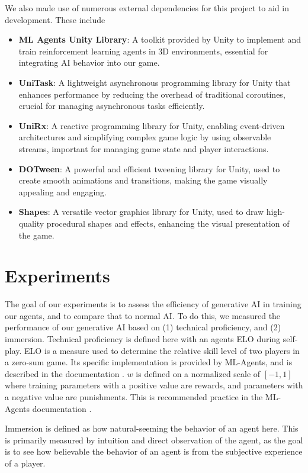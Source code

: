 \documentclass[a4paper,12pt,twocolumn]{article}
\begin{document}
We also made use of numerous external dependencies for this project to aid in development. These include
\begin{itemize}
    \item \textbf{ML Agents Unity Library}: A toolkit provided by Unity to implement and train reinforcement learning agents in 3D environments, essential for integrating AI behavior into our game.
    \item \textbf{UniTask}: A lightweight asynchronous programming library for Unity that enhances performance by reducing the overhead of traditional coroutines, crucial for managing asynchronous tasks efficiently.
    \item \textbf{UniRx}: A reactive programming library for Unity, enabling event-driven architectures and simplifying complex game logic by using observable streams, important for managing game state and player interactions.
    \item \textbf{DOTween}: A powerful and efficient tweening library for Unity, used to create smooth animations and transitions, making the game visually appealing and engaging.
    \item \textbf{Shapes}: A versatile vector graphics library for Unity, used to draw high-quality procedural shapes and effects, enhancing the visual presentation of the game.
\end{itemize}


\section{Experiments}
The goal of our experiments is to assess the efficiency of generative AI in training our agents, and to compare that to normal AI. To do this, we measured the performance of our generative AI based on (1) technical proficiency, and (2) immersion. Technical proficiency is defined here with an agents ELO during self-play. ELO is a measure used to determine the relative skill level of two players in a zero-sum game. Its specific implementation is provided by ML-Agents, and is described in the documentation \cite{unity_training_configuration}. $w$ is defined on a normalized scale of $[-1,1]$ where training parameters with a positive value are rewards, and parameters with a negative value are punishments. This is recommended practice in the ML-Agents documentation \cite{unity_ml_agents_documentation}.

Immersion is defined as how natural-seeming the behavior of an agent here. This is primarily measured by intuition and direct observation of the agent, as the goal is to see how believable the behavior of an agent is from the subjective experience of a player.
\end{document}
